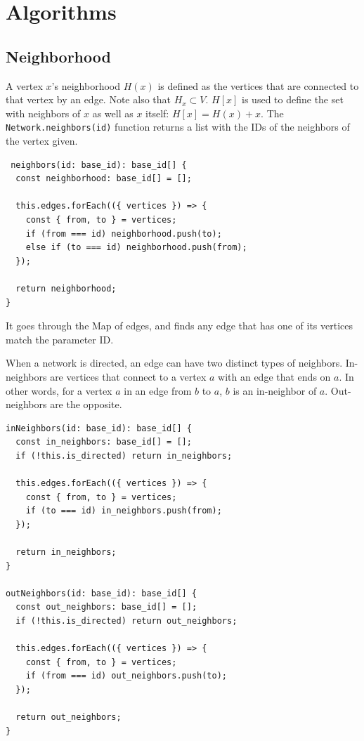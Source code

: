 \chapter{Algorithms}

\section{Neighborhood}
A vertex $x$'s neighborhood $H(x)$ is defined as the vertices that are connected to that vertex
by an edge. Note also that $H_x\subset V$.
$H[x]$ is used to define the set with neighbors of $x$ as well as $x$ itself: $H[x]=H(x)+x$.
The \texttt{Network.neighbors(id)}
function returns a list with the IDs of the neighbors of the vertex given.


\begin{verbatim}
 neighbors(id: base_id): base_id[] {
  const neighborhood: base_id[] = [];

  this.edges.forEach(({ vertices }) => {
    const { from, to } = vertices;
    if (from === id) neighborhood.push(to);
    else if (to === id) neighborhood.push(from);
  });

  return neighborhood;
}
\end{verbatim}

It goes through the Map of edges,
and finds any edge that has one of its vertices match the parameter ID.

When a network is directed, an edge can have two distinct types of neighbors.
In-neighbors are vertices that connect to a vertex $a$ with an edge that ends on $a$.
In other words, for a vertex $a$ in an edge from $b$ to $a$, $b$ is an in-neighbor of $a$.
Out-neighbors are the opposite.

\begin{verbatim}
inNeighbors(id: base_id): base_id[] {
  const in_neighbors: base_id[] = [];
  if (!this.is_directed) return in_neighbors;

  this.edges.forEach(({ vertices }) => {
    const { from, to } = vertices;
    if (to === id) in_neighbors.push(from);
  });

  return in_neighbors;
}

outNeighbors(id: base_id): base_id[] {
  const out_neighbors: base_id[] = [];
  if (!this.is_directed) return out_neighbors;

  this.edges.forEach(({ vertices }) => {
    const { from, to } = vertices;
    if (from === id) out_neighbors.push(to);
  });

  return out_neighbors;
}
\end{verbatim}

